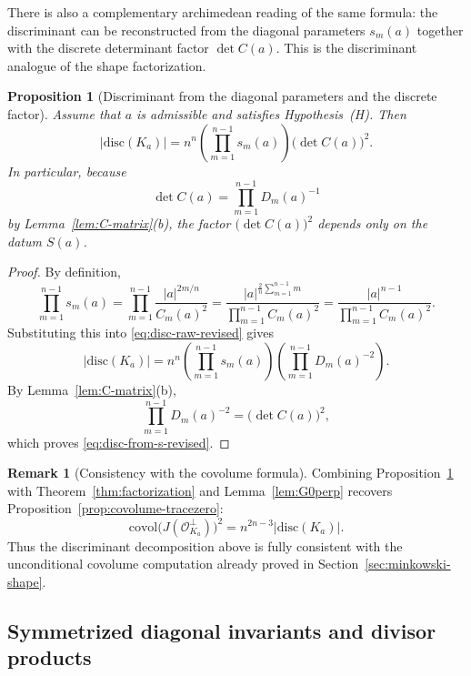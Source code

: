 \documentclass[11pt,letterpaper]{amsart}
\newcommand{\cO}{\mathcal{O}}
\newcommand{\disc}{\mathrm{disc}}
\theoremstyle{plain}
\newtheorem{proposition}[theorem]{Proposition}
\theoremstyle{definition}
\newtheorem{remark}[theorem]{Remark}
\begin{document}
There is also a complementary archimedean reading of the same formula: the discriminant can be reconstructed from the diagonal parameters \(s_m(a)\) together with the discrete determinant factor \(\det C(a)\). This is the discriminant analogue of the shape factorization.


\begin{proposition}[Discriminant from the diagonal parameters and the discrete factor]
\label{prop:disc-from-s-revised}
Assume that $a$ is admissible and satisfies Hypothesis~\textup{(H)}.
Then
\begin{equation}\label{eq:disc-from-s-revised}
|\disc(K_a)|
=n^n\left(\prod_{m=1}^{n-1}s_m(a)\right)\bigl(\det C(a)\bigr)^2.
\end{equation}
In particular, because
\[
\det C(a)=\prod_{m=1}^{n-1} D_m(a)^{-1}
\]
by Lemma~\ref{lem:C-matrix}\textup{(b)}, the factor $\bigl(\det C(a)\bigr)^2$ depends only on the datum $S(a)$.
\end{proposition}

\begin{proof}
By definition,
\[
\prod_{m=1}^{n-1}s_m(a)
=\prod_{m=1}^{n-1}\frac{|a|^{2m/n}}{C_m(a)^2}
=\frac{|a|^{\frac{2}{n}\sum_{m=1}^{n-1}m}}{\prod_{m=1}^{n-1}C_m(a)^2}
=\frac{|a|^{n-1}}{\prod_{m=1}^{n-1}C_m(a)^2}.
\]
Substituting this into \eqref{eq:disc-raw-revised} gives
\[
|\disc(K_a)|
=n^n\left(\prod_{m=1}^{n-1}s_m(a)\right)\left(\prod_{m=1}^{n-1}D_m(a)^{-2}\right).
\]
By Lemma~\ref{lem:C-matrix}\textup{(b)},
\[
\prod_{m=1}^{n-1}D_m(a)^{-2}=\bigl(\det C(a)\bigr)^2,
\]
which proves \eqref{eq:disc-from-s-revised}.
\end{proof}

\begin{remark}[Consistency with the covolume formula]\label{rem:disc-covolume-consistency}
Combining Proposition~\ref{prop:disc-from-s-revised} with Theorem~\ref{thm:factorization} and
Lemma~\ref{lem:G0perp} recovers Proposition~\ref{prop:covolume-tracezero}:
\[
\mathrm{covol}\bigl(J(\cO_{K_a}^\perp)\bigr)^2=n^{2n-3}|\disc(K_a)|.
\]
Thus the discriminant decomposition above is fully consistent with the unconditional covolume computation already
proved in Section~\ref{sec:minkowski-shape}.
\end{remark}

\subsection{Symmetrized diagonal invariants and divisor products}
\end{document}

